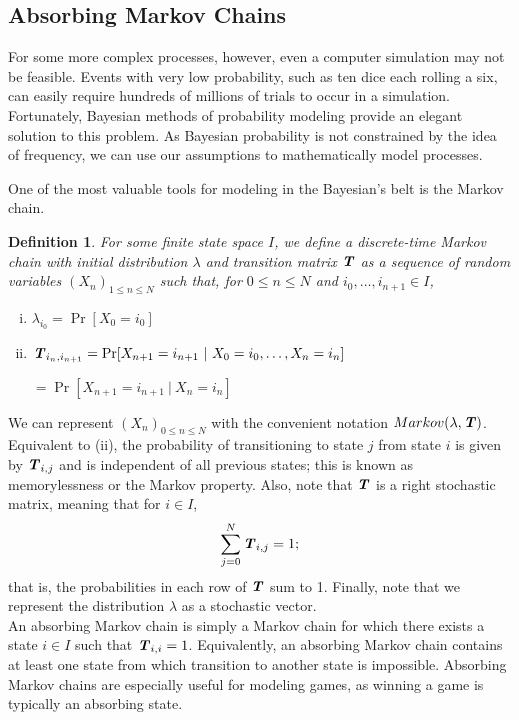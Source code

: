 \documentclass{article}
\newcommand{\T}{\textbf{\textit{T}}}
\newtheorem{defcon}{Definition}
\begin{document}
	\subsection{Absorbing Markov Chains}
	For some more complex processes, however, even a computer simulation may not be feasible. Events with very low probability, such as ten dice each rolling a six, can easily require hundreds of millions of trials to occur in a simulation. Fortunately, Bayesian methods of probability modeling provide an elegant solution to this problem. As Bayesian probability is not constrained by the idea of frequency, we can use our assumptions to mathematically model processes.


	One of the most valuable tools for modeling in the Bayesian's belt is the Markov chain. 

	\begin{defcon}For some finite state space $I$, we define a discrete-time Markov chain with initial distribution $\lambda$ and transition matrix $\T$ as a  sequence of random variables $(X_n)_{1\leq n \leq N}$ such that, for $0 \leq n \leq N$ and $i_0, \dots, i_{n+1} \in I$,
\begin{enumerate}[(i)]
\item $\lambda_{i_0} = \Pr[X_0 = i_0]$  
\item $\T_{i_n, i_{n+1}} = \Pr[X_{n+1} = i_{n+1} ~|~ {X_0 = i_0}, \dots, X_{n}=i_n]$

\hspace{3.9em}$ = \Pr[X_{n+1} = i_{n+1} ~|~ X_{n} = i_n]$
\end{enumerate}
	\end{defcon}
We can represent $(X_n)_{0 \leq n \leq N}$ with the convenient notation $Markov(\lambda, \T)$. Equivalent to (ii), the probability of transitioning to state $j$ from state $i$ is given by $\T_{i, j}$ and is independent of all previous states; this is known as memorylessness or the Markov property. Also, note that $\T$ is a right stochastic matrix, meaning that for $i \in I$, \[\sum_{j=0}^{N} \T_{i, j} = 1;\] that is, the probabilities in each row of $\T$ sum to 1. Finally, note that we represent the distribution $\lambda$ as a stochastic vector.
\\
	
	An absorbing Markov chain is simply a Markov chain for which there exists a state $i \in I$ such that $\T_{i,i} = 1$. Equivalently, an absorbing Markov chain contains at least one state from which transition to another state is impossible. Absorbing Markov chains are especially useful for modeling games, as winning a game is typically an absorbing state.
	
\end{document}
